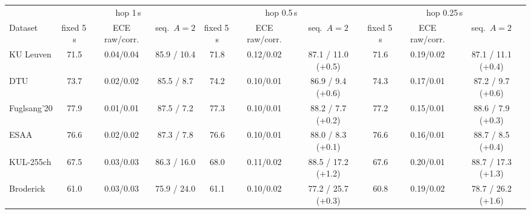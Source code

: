 \begin{tabular}{lccccccccc}\toprule
& \multicolumn{3}{c}{hop 1\,s} & \multicolumn{3}{c}{hop 0.5\,s} & \multicolumn{3}{c}{hop 0.25\,s} \\
\cmidrule(lr){2-4}\cmidrule(lr){5-7}\cmidrule(lr){8-10}
Dataset & fixed 5\,s & ECE raw/corr. & seq.\ $A{=}2$ & fixed 5\,s & ECE raw/corr. & seq.\ $A{=}2$ & fixed 5\,s & ECE raw/corr. & seq.\ $A{=}2$ \\\midrule
KU Leuven & 71.5 & 0.04/0.04 & 85.9 / 10.4 & 71.8 & 0.12/0.02 & 87.1 / 11.0 (+0.5) & 71.6 & 0.19/0.02 & 87.1 / 11.1 (+0.4) \\
DTU & 73.7 & 0.02/0.02 & 85.5 / 8.7 & 74.2 & 0.10/0.01 & 86.9 / 9.4 (+0.6) & 74.3 & 0.17/0.01 & 87.2 / 9.7 (+0.6) \\
Fuglsang'20 & 77.9 & 0.01/0.01 & 87.5 / 7.2 & 77.3 & 0.10/0.01 & 88.2 / 7.7 (+0.2) & 77.2 & 0.15/0.01 & 88.6 / 7.9 (+0.3) \\
ESAA & 76.6 & 0.02/0.02 & 87.3 / 7.8 & 76.6 & 0.10/0.01 & 88.0 / 8.3 (+0.1) & 76.6 & 0.16/0.01 & 88.7 / 8.5 (+0.4) \\
KUL-255ch & 67.5 & 0.03/0.03 & 86.3 / 16.0 & 68.0 & 0.11/0.02 & 88.5 / 17.2 (+1.2) & 67.6 & 0.20/0.01 & 88.7 / 17.3 (+1.3) \\
Broderick & 61.0 & 0.03/0.03 & 75.9 / 24.0 & 61.1 & 0.10/0.02 & 77.2 / 25.7 (+0.3) & 60.8 & 0.19/0.02 & 78.7 / 26.2 (+1.6) \\
\bottomrule\end{tabular}
